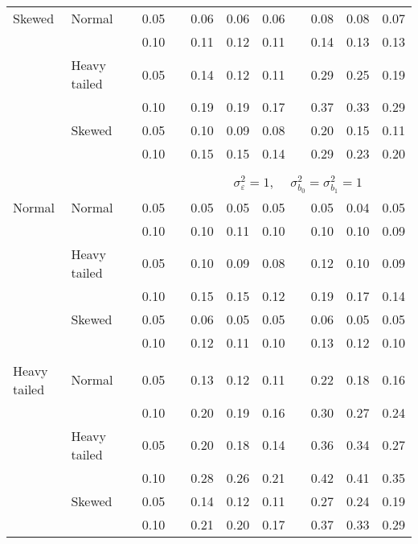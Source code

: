 \begin{table}[ht]
\begin{scriptsize}
\begin{center}
\begin{tabular}{ll p{.1cm} c p{.1cm} rrr p{.1cm} rrr}
Skewed       & Normal       && 0.05 &&  0.06 & 0.06 & 0.06 && 0.08 & 0.08 & 0.07 \\ 
             &              && 0.10 &&  0.11 & 0.12 & 0.11 && 0.14 & 0.13 & 0.13 \\ 
             & Heavy tailed && 0.05 &&  0.14 & 0.12 & 0.11 && 0.29 & 0.25 & 0.19 \\ 
             &              && 0.10 &&  0.19 & 0.19 & 0.17 && 0.37 & 0.33 & 0.29 \\ 
             & Skewed       && 0.05 &&  0.10 & 0.09 & 0.08 && 0.20 & 0.15 & 0.11 \\ 
             &              && 0.10 &&  0.15 & 0.15 & 0.14 && 0.29 & 0.23 & 0.20 \\ 

&&&&&&&&&&&\\
& && && \multicolumn{7}{c}{$\sigma_{\varepsilon}^2 = 1$, \ \ $\sigma_{b_0}^2 = \sigma_{b_1}^2 = 1$} \\ \cline{6-12}
\rowcolor{gray!20}Normal       & Normal       && 0.05 &&  0.05 & 0.05 & 0.05 && 0.05 & 0.04 & 0.05 \\ 
\rowcolor{gray!20}             &              && 0.10 &&  0.10 & 0.11 & 0.10 && 0.10 & 0.10 & 0.09 \\ 
\rowcolor{gray!20}             & Heavy tailed && 0.05 &&  0.10 & 0.09 & 0.08 && 0.12 & 0.10 & 0.09 \\ 
\rowcolor{gray!20}             &              && 0.10 &&  0.15 & 0.15 & 0.12 && 0.19 & 0.17 & 0.14 \\ 
\rowcolor{gray!20}             & Skewed       && 0.05 &&  0.06 & 0.05 & 0.05 && 0.06 & 0.05 & 0.05 \\ 
\rowcolor{gray!20}             &              && 0.10 &&  0.12 & 0.11 & 0.10 && 0.13 & 0.12 & 0.10 \\ 
             &&&&&&&&&&&\\
Heavy tailed & Normal       && 0.05 &&  0.13 & 0.12 & 0.11 && 0.22 & 0.18 & 0.16 \\ 
             &              && 0.10 &&  0.20 & 0.19 & 0.16 && 0.30 & 0.27 & 0.24 \\ 
             & Heavy tailed && 0.05 &&  0.20 & 0.18 & 0.14 && 0.36 & 0.34 & 0.27 \\ 
             &              && 0.10 &&  0.28 & 0.26 & 0.21 && 0.42 & 0.41 & 0.35 \\ 
             & Skewed       && 0.05 &&  0.14 & 0.12 & 0.11 && 0.27 & 0.24 & 0.19 \\ 
             &              && 0.10 &&  0.21 & 0.20 & 0.17 && 0.37 & 0.33 & 0.29 \\ 

\end{tabular}
\end{center}
\end{scriptsize}
\end{table}

